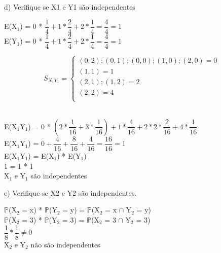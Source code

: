 \documentclass[12pt,a4paper,draft]{article}
\begin{document}
	\vspace{1cm}
	d) Verifique se X1 e Y1 são independentes
	\vspace{1cm}\\
	\begin{center}
		E(X$_{1}$) = 0 * $\dfrac{1}{4} + 1 * \dfrac{2}{4} + 2 * \dfrac{1}{4} = \dfrac{4}{4} = 1$
		\vspace{1cm}\\
		E(Y$_{1}$) = 0 * $\dfrac{1}{4} + 1 * \dfrac{2}{4} + 2 * \dfrac{1}{4} = \dfrac{4}{4} = 1$
	\end{center}
	\vspace{1cm}
	\[
	S_{X_{1}Y_{1}} =
	\begin{cases}
		(0, 2); (0, 1); (0,0); (1,0); (2, 0) = 0\\
		(1,1) = 1\\
		(2, 1); (1, 2) = 2\\
		(2, 2) = 4\\
	\end{cases}
	\]
	\vspace{1cm}\\
	\begin{center}
		E(X$_{1}$Y$_{1}$) =  0 * $\left( 2 * \dfrac{1}{16} + 3 *\dfrac{1}{16}\right) + 1 * \dfrac{4}{16} + 2 * 2 * \dfrac{2}{16} + 4 * \dfrac{1}{16}$
		\vspace{0.25cm}\\
		E(X$_{1}$Y$_{1}$) =  $0 + \dfrac{4}{16} + \dfrac{8}{16} + \dfrac{4}{16} = \dfrac{16}{16} = 1$
		\vspace{1cm}\\
		E(X$_{1}$Y$_{1}$) = E(X$_{1}$) * E(Y$_{1}$)
		\vspace{0.25cm}\\
		1 = 1 * 1
		\vspace{1cm}\\
		X$_{1}$ e Y$_{1}$ são independentes
	\end{center}
	\vspace{1cm}
	e) Verifique se X2 e Y2 são
	independentes.
	\vspace{1cm}\\
	\begin{center}
			$\mathbb{P}$(X$_{2}$ = x) * $\mathbb{P}$(Y$_{2}$ = y) = $\mathbb{P}$(X$_{2}$ = x $\cap$ Y$_{2}$ = y)
			\vspace{1cm}\\
			$\mathbb{P}$(X$_{2}$ = 3) * $\mathbb{P}$(Y$_{2}$ = 3) = $\mathbb{P}$(X$_{2}$ = 3 $\cap$ Y$_{2}$ = 3)
			\vspace{0.25cm}\\
			$\dfrac{1}{8} * \dfrac{1}{8} \neq 0$
			\vspace{1cm}\\
			X$_{2}$ e Y$_{2}$ não são independentes
	\end{center}
\end{document}
